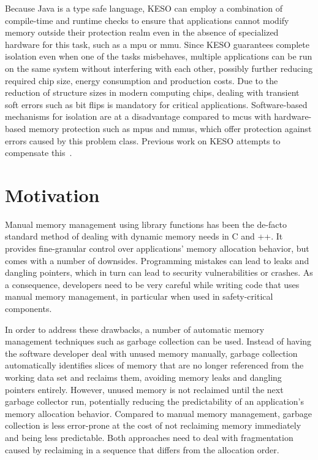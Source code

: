 		Because Java is a type safe language, KESO can employ a combination of compile-time and runtime checks to ensure
		that applications cannot modify memory outside their protection realm even in the absence of specialized hardware
		for this task, such as a \gls{mpu} or \gls{mmu}. Since KESO guarantees complete isolation even when one of the tasks
		misbehaves, multiple applications can be run on the same system without interfering with each other, possibly
		further reducing required chip size, energy consumption and production costs. Due to the reduction of structure
		sizes in modern computing chips, dealing with transient soft errors such as bit flips is mandatory for critical
		applications. Software-based mechanisms for isolation are at a disadvantage compared to \glspl{mcu} with
		hardware-based memory protection such as \glspl{mpu} and \glspl{mmu}, which offer protection against errors caused
		by this problem class. Previous work on KESO attempts to compensate this~\cite{thomm:11:jtres, stilkerich:13:lctes}.

	\section{Motivation}
		\label{sec:intro:motivation}

		Manual memory management using library functions has been the de-facto standard method of dealing with dynamic
		memory needs in C and \C++{}. It provides fine-granular control over applications' memory allocation behavior, but
		comes with a number of downsides. Programming mistakes can lead to leaks and dangling pointers, which in turn can
		lead to security vulnerabilities or crashes. As a consequence, developers need to be very careful while writing code
		that uses manual memory management, in particular when used in safety-critical components.

		In order to address these drawbacks, a number of automatic memory management techniques such as garbage collection
		can be used. Instead of having the software developer deal with unused memory manually, garbage collection
		automatically identifies slices of memory that are no longer referenced from the working data set and reclaims them,
		avoiding memory leaks and dangling pointers entirely. However, unused memory is not reclaimed until the next garbage
		collector run, potentially reducing the predictability of an application's memory allocation behavior. Compared to
		manual memory management, garbage collection is less error-prone at the cost of not reclaiming memory immediately
		and being less predictable. Both approaches need to deal with fragmentation caused by reclaiming in a sequence that
		differs from the allocation order.

